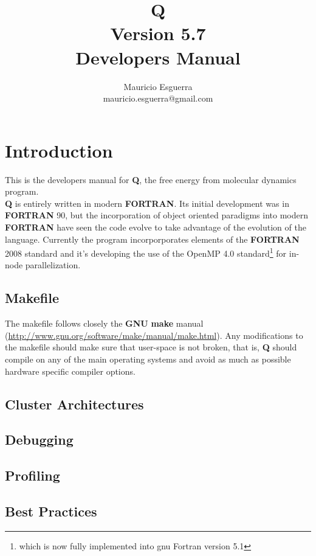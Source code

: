 \documentclass[10pt, oneside, pdftex]{article}
\title{Q\\
    \LARGE Version 5.7 \\
    \LARGE \vspace*{-10pt}Developers Manual\vspace*{10pt}}
\author{
  \vspace{10pt}
  Mauricio Esguerra \\
  \vspace{4pt}
  mauricio.esguerra@gmail.com \\
  \vspace{20pt}
  }
\makeatletter
\def\printtitle{
{\color{bl} \centering \Huge \textbf{\@title}\par}} %
\def\printauthor{                        %
{\centering \small \@author}}            %
\makeatother
\begin{document}
\printtitle
\printauthor
\tableofcontents
%

\vspace{20pt}
\section{Introduction}
This is  the developers manual  for \textbf{Q}, the free  energy from
molecular dynamics program.\\
\noindent \textbf{Q}  is entirely written in  modern \textbf{FORTRAN}.
Its  initial   development  was   in  \textbf{FORTRAN}  90,   but  the
incorporation    of   object    oriented    paradigms   into    modern
\textbf{FORTRAN} have  seen the code  evolve to take advantage  of the
evolution  of the  language.   Currently  the program  incorporporates
elements of  the \textbf{FORTRAN} 2008  standard and it's developing
the  use  of  the  OpenMP 4.0  standard\footnote{which  is  now  fully
implemented   into    gnu   Fortran    version   5.1}    for   in-node
parallelization.\\


\subsection{Makefile}
\label{makefile}
The  makefile follows  closely the  \textbf{GNU} \textbf{make}  manual
(\url{http://www.gnu.org/software/make/manual/make.html}).         Any
modifications to the makefile should  make sure that user-space is not
broken,  that  is,  \textbf{Q}  should  compile on  any  of  the  main
operating  systems and  avoid as  much as  possible hardware  specific
compiler options.\\

\subsection{Cluster Architectures}
\label{clusterarchitectures}


\subsection{Debugging}
\label{debugging}


\subsection{Profiling}
\label{profiling}

\subsection{Best Practices}
\label{bestpractices}
\end{document}
